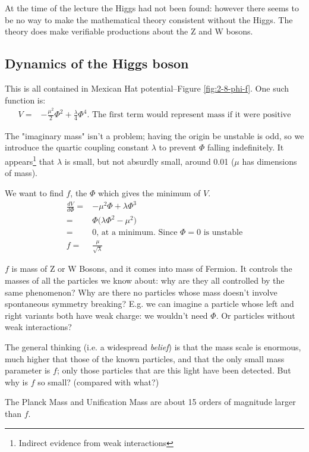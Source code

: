 \documentclass[]{article}
\begin{document}
At the time of the lecture the Higgs had not been found: however there seems to be no way to make the mathematical theory consistent without the Higgs. The theory does make verifiable productions about the Z and W bosons.


\subsection{Dynamics of the Higgs boson}

This is all contained in Mexican Hat potential--Figure \ref{fig:2-8-phi-f}. One such function is:
\begin{align*}
	V =& -\frac{\mu^2}{2} \Phi^2 + \frac{\lambda}{4} \Phi^4 \text{. The first term would represent mass if it were positive}
\end{align*}

The "imaginary mass" isn't a problem; having the origin be unstable is odd, so we introduce the quartic coupling constant $\lambda$ to prevent $\Phi$ falling indefinitely. It appears\footnote{Indirect evidence from weak interactions} that $\lambda$ is small, but not absurdly small, around 0.01 ($\mu$ has dimensions of mass).

We want to find $f$, the $\Phi$ which gives the minimum of $V$.
\begin{align*}
	\frac{d V}{d \Phi} =& -\mu^2 \Phi + \lambda \Phi^3\\
	=& \Phi \big(\lambda \Phi^2 - \mu^2\big)\\
	=& 0 \text{, at a minimum. Since $\Phi=0$ is unstable}\\
	f =& \frac{\mu}{\sqrt{\lambda}}
\end{align*}

$f$ is mass of Z or W Bosons, and it comes into mass of Fermion. It controls the masses of all the particles we know about: why are they all controlled by the same phenomenon? Why are there no particles whose mass doesn't involve spontaneous symmetry breaking? E.g. we can imagine a particle whose left and right variants both have weak charge: we wouldn't need $\Phi$. Or particles without weak interactions?

The general thinking (i.e. a widespread \emph{belief}) is that the mass scale is enormous, much higher that those of the known particles, and that the only small mass parameter is $f$; only those particles that are this light have been detected. But why is $f$ so small? (compared with what?) 

The Planck Mass and Unification Mass are about 15 orders of magnitude larger than $f$.
\end{document}
